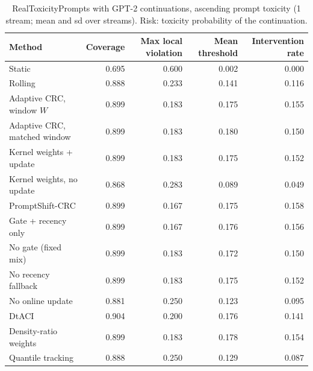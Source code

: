\begin{table}[H]
\centering
\small
\caption{RealToxicityPrompts with GPT-2 continuations, ascending prompt toxicity (1 stream; mean and sd over streams). Risk: toxicity probability of the continuation.}
\label{tab:rtp_prompt_toxicity_ascending}
\begin{tabular}{lrrrr}
\toprule
Method & Coverage & Max local violation & Mean threshold & Intervention rate \\
\midrule
Static & 0.695 & 0.600 & 0.002 & 0.000 \\
Rolling & 0.888 & 0.233 & 0.141 & 0.116 \\
Adaptive CRC, window $W$ & 0.899 & 0.183 & 0.175 & 0.155 \\
Adaptive CRC, matched window & 0.899 & 0.183 & 0.180 & 0.150 \\
Kernel weights + update & 0.899 & 0.183 & 0.175 & 0.152 \\
Kernel weights, no update & 0.868 & 0.283 & 0.089 & 0.049 \\
PromptShift-CRC & 0.899 & 0.167 & 0.175 & 0.158 \\
Gate + recency only & 0.899 & 0.167 & 0.176 & 0.156 \\
No gate (fixed mix) & 0.899 & 0.183 & 0.172 & 0.150 \\
No recency fallback & 0.899 & 0.183 & 0.175 & 0.152 \\
No online update & 0.881 & 0.250 & 0.123 & 0.095 \\
DtACI & 0.904 & 0.200 & 0.176 & 0.141 \\
Density-ratio weights & 0.899 & 0.183 & 0.178 & 0.154 \\
Quantile tracking & 0.888 & 0.250 & 0.129 & 0.087 \\
\bottomrule
\end{tabular}
\end{table}

